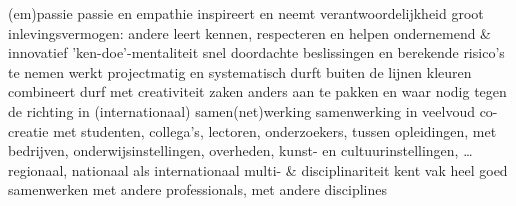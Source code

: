 
\begin{outline}
  \1 (em)passie
    \2 passie en empathie
    \2 inspireert en neemt verantwoordelijkheid
    \2 groot inlevingsvermogen: andere leert kennen, respecteren en helpen
  \1 ondernemend \& innovatief
    \2 'ken-doe'-mentaliteit
    \2 snel doordachte beslissingen en berekende risico's te nemen
    \2 werkt projectmatig en systematisch
    \2 durft buiten de lijnen kleuren
    \2 combineert durf met creativiteit
    \2 zaken anders aan te pakken en waar nodig tegen de richting in
  \1 (internationaal) samen(net)werking
    \2 samenwerking in veelvoud
    \2 co-creatie met studenten, collega's, lectoren, onderzoekers, tussen opleidingen, met bedrijven, onderwijsinstellingen, overheden, kunst- en cultuurinstellingen, \dots
    \2 regionaal, nationaal als internationaal
  \1 multi- \& disciplinariteit
    \2 kent vak heel goed
    \2 samenwerken met andere professionals, met andere disciplines
\end{outline}